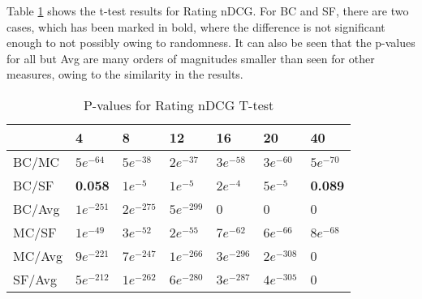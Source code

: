 Table \ref{tbl:andcg_ttest} shows the t-test results for Rating nDCG. For BC and SF, there are two cases, which has been marked in bold, where the difference is not significant enough to not possibly owing to randomness. It can also be seen that the p-values for all but Avg are many orders of magnitudes smaller than seen for other measures, owing to the similarity in the results.

\begin{table}[H]
	\centering
	\begin{tabular}{|l|llllll|}\hline
		& 4 & 8 & 12 & 16 & 20 & 40 \\\hline
		BC/MC	& $5e^{-64}$	& $5e^{-38}$	& $2e^{-37}$	& $3e^{-58}$	& $3e^{-60}$ & $5e^{-70}$ \\
		BC/SF	& \textbf{0.058}	& $1e^{-5}$	& $1e^{-5}$	& $2e^{-4}$	& $5e^{-5}$ & \textbf{0.089} \\
		BC/Avg	& $1e^{-251}$	& $2e^{-275}$ 	& $5e^{-299}$	& 0	& 0 & 0 \\
		MC/SF	& $1e^{-49}$	& $3e^{-52}$ 	& $2e^{-55}$	& $7e^{-62}$	& $6e^{-66}$ & $8e^{-68}$ \\
		MC/Avg	& $9e^{-221}$	& $7e^{-247}$ 	& $1e^{-266}$	& $3e^{-296}$	& $2e^{-308}$ & 0 \\
		SF/Avg	& $5e^{-212}$	& $1e^{-262}$ 	& $6e^{-280}$	& $3e^{-287}$	& $4e^{-305}$ & 0 \\ \hline
	\end{tabular}
	\caption{P-values for Rating nDCG T-test}
	\label{tbl:andcg_ttest}
\end{table}